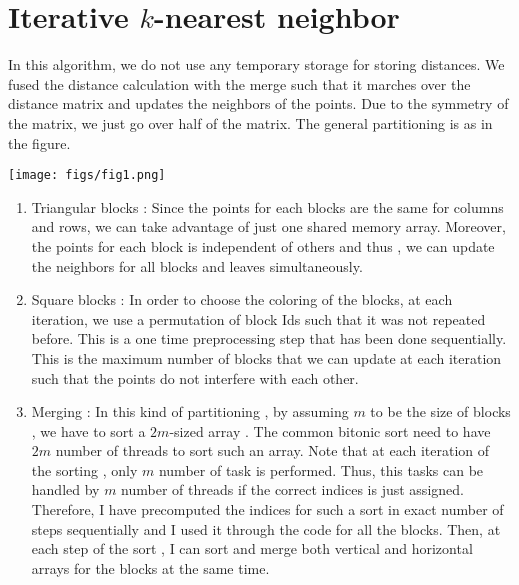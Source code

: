 \documentclass{article}
\begin{document}
\section{Iterative $k$-nearest neighbor}

In this algorithm, we do not use any temporary storage for storing distances. We fused the 
distance calculation with the merge such that it marches over the distance matrix and updates the neighbors of the 
points. Due to the symmetry of the matrix, we just go over half of the matrix. The general partitioning is as in the figure. 
\begin{center}
    \texttt{[image: figs/fig1.png]}
\end{center}
    

\begin{enumerate}
    \item Triangular blocks : Since the points for each blocks are the same for 
    columns and rows, we can take advantage of just one shared memory array. Moreover, the points for each 
    block is independent of others and thus , we can update the neighbors for all blocks and leaves simultaneously. 
    \item Square blocks : In order to choose the coloring of the blocks, at each iteration, we use a permutation of 
    block Ids such that it was not repeated before. This is a one time preprocessing step that has been done sequentially.
    This is the maximum number of blocks that we can update at each iteration 
    such that the points do not interfere with each other. \\
    \item Merging : In this kind of partitioning , by assuming $m$ to be the size of blocks , we have to sort a 
    $2m$-sized array . The common bitonic sort need to have $2m$ number of threads to sort such an array. Note that 
    at each iteration of the sorting , only $m$ number of task is performed. Thus, this tasks can be handled by $m$ 
    number of threads if the correct indices is just assigned. Therefore, I have precomputed the 
    indices for such a sort in exact number of steps sequentially and I used it through the code for all the blocks.  
    Then, at each step of the sort , I can sort and merge both vertical and horizontal arrays for the blocks at the same time.  
\end{enumerate}
\end{document}
